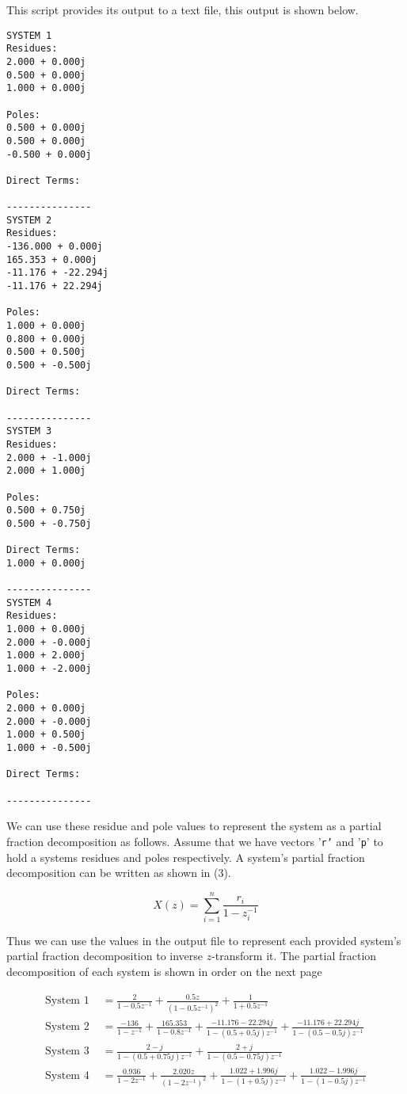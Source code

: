 \documentclass[]{report}
\begin{document}
This script provides its output to a text file, this output is shown below.

\begin{lstlisting}[frame=single]
SYSTEM 1
Residues:
2.000 + 0.000j
0.500 + 0.000j
1.000 + 0.000j

Poles:
0.500 + 0.000j
0.500 + 0.000j
-0.500 + 0.000j

Direct Terms:

---------------
SYSTEM 2
Residues:
-136.000 + 0.000j
165.353 + 0.000j
-11.176 + -22.294j
-11.176 + 22.294j

Poles:
1.000 + 0.000j
0.800 + 0.000j
0.500 + 0.500j
0.500 + -0.500j

Direct Terms:

---------------
SYSTEM 3
Residues:
2.000 + -1.000j
2.000 + 1.000j

Poles:
0.500 + 0.750j
0.500 + -0.750j

Direct Terms:
1.000 + 0.000j

---------------
SYSTEM 4
Residues:
1.000 + 0.000j
2.000 + -0.000j
1.000 + 2.000j
1.000 + -2.000j

Poles:
2.000 + 0.000j
2.000 + -0.000j
1.000 + 0.500j
1.000 + -0.500j

Direct Terms:

---------------
\end{lstlisting}

We can use these residue and pole values to represent the system as a partial fraction decomposition as follows. Assume that we have vectors '\texttt{r'} and '\texttt{p}' to hold a systems residues and poles respectively. A system's partial fraction decomposition can be written as shown in (3).

\begin{equation}
	X(z) = \sum_{i=1}^{n} \frac{r_i}{1 - z_{i}^{-1}}
\end{equation}

Thus we can use the values in the output file to represent each provided system's partial fraction decomposition to inverse $z$-transform it. The partial fraction decomposition of each system is shown in order on the next page

\newpage

\begin{align*}
	\text{System 1 } &= \frac{2}{1-0.5z^{-1}} + \frac{0.5z}{\left(1 - 0.5z^{-1}\right)^2} + \frac{1}{1 + 0.5z^{-1}} \\
	\text{System 2 } &= \frac{-136}{1 - z^{-1}} + \frac{165.353}{1 - 0.8z^{-1}} + \frac{-11.176 - 22.294j}{1 -  (0.5 + 0.5j)z^{-1}} + \frac{-11.176 + 22.294j}{1 - (0.5 - 0.5j)z^{-1}} \\
	\text{System 3 } &= \frac{2 - j}{1 - (0.5 + 0.75j)z^{-1}} + \frac{2 + j}{1 - (0.5 - 0.75j)z^{-1}} \\
	\text{System 4 } &= \frac{0.936}{1 - 2z^{-1}} +  \frac{2.020z}{(1 - 2z^{-1})^2}  + \frac{1.022 + 1.996j}{1 - (1 + 0.5j)z^{-1}}  + \frac{1.022 - 1.996j}{1 - (1 - 0.5j)z^{-1}}
\end{align*}
\end{document}
